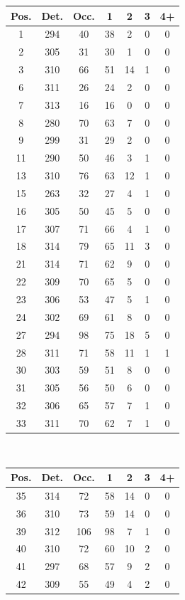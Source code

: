 \documentclass[pdftex,12pt,a4paper]{report}
\begin{document}
\begin{appendices}
\begin{table}[H]
\begin{tabular}[t]{ c | c | c | c | c | c | c }
\hline
Pos. & Det. & Occ. & 1 & 2 & 3 & 4+
\\
\hline\hline
1 & 294 & 40 & 38 & 2 & 0 & 0
\\
2 & 305 & 31 & 30 & 1 & 0 & 0
\\
3 & 310 & 66 & 51 & 14 & 1 & 0
\\
6 & 311 & 26 & 24 & 2 & 0 & 0
\\
7 & 313 & 16 & 16 & 0 & 0 & 0
\\
8 & 280 & 70 & 63 & 7 & 0 & 0
\\
9 & 299 & 31 & 29 & 2 & 0 & 0
\\
11 & 290 & 50 & 46 & 3 & 1 & 0
\\
13 & 310 & 76 & 63 & 12 & 1 & 0
\\
15 & 263 & 32 & 27 & 4 & 1 & 0
\\
16 & 305 & 50 & 45 & 5 & 0 & 0
\\
17 & 307 & 71 & 66 & 4 & 1 & 0
\\
18 & 314 & 79 & 65 & 11 & 3 & 0
\\
21 & 314 & 71 & 62 & 9 & 0 & 0
\\
22 & 309 & 70 & 65 & 5 & 0 & 0
\\
23 & 306 & 53 & 47 & 5 & 1 & 0
\\
24 & 302 & 69 & 61 & 8 & 0 & 0
\\
27 & 294 & 98 & 75 & 18 & 5 & 0
\\
28 & 311 & 71 & 58 & 11 & 1 & 1
\\
30 & 303 & 59 & 51 & 8 & 0 & 0
\\
31 & 305 & 56 & 50 & 6 & 0 & 0
\\
32 & 306 & 65 & 57 & 7 & 1 & 0
\\
33 & 311 & 70 & 62 & 7 & 1 & 0
\end{tabular}
~
\begin{tabular}[t]{ c | c | c | c | c | c | c }
\hline
Pos. & Det. & Occ. & 1 & 2 & 3 & 4+
\\
\hline\hline
35 & 314 & 72 & 58 & 14 & 0 & 0
\\
36 & 310 & 73 & 59 & 14 & 0 & 0
\\
39 & 312 & 106 & 98 & 7 & 1 & 0
\\
40 & 310 & 72 & 60 & 10 & 2 & 0
\\
41 & 297 & 68 & 57 & 9 & 2 & 0
\\
42 & 309 & 55 & 49 & 4 & 2 & 0

\end{tabular}
\end{table}
\end{appendices}
\end{document}
